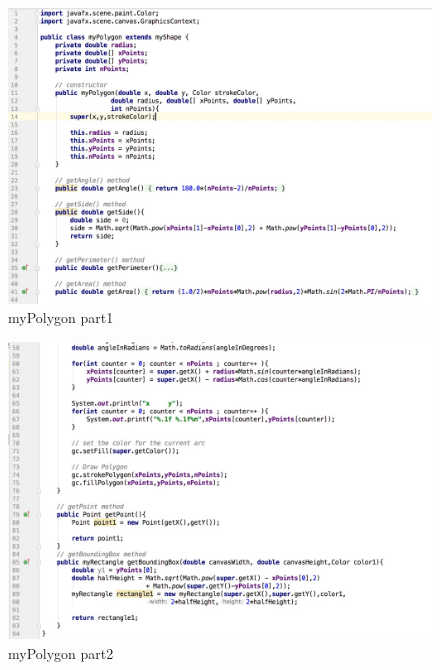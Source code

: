 \documentclass[a4paper,12pt]{article}
\begin{document}
\begin{figure}[H]
   \centering
   \includegraphics[width = 17cm]{myPolygon_part1} %
   \caption{myPolygon part1}
   \label{myPolygon part1}
\end{figure}




\begin{figure}[H]
   \centering
   \includegraphics[width = 17cm]{myPolygon_part2} %
   \caption{myPolygon part2}
   \label{myPolygon part2}
\end{figure}
\end{document}
